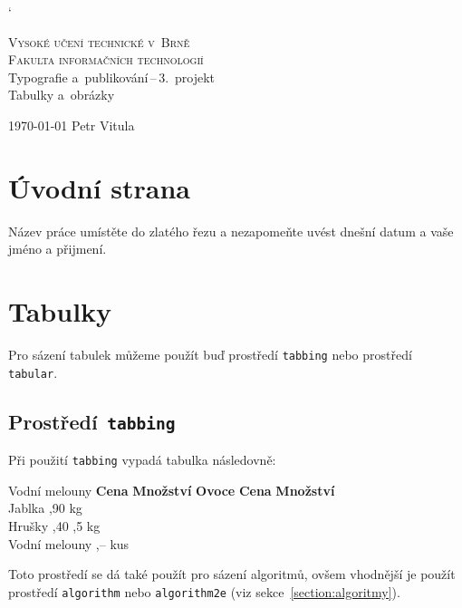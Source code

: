 \documentclass[a4paper, 11pt]{article}
\begin{document}
\catcode`

\begin{titlepage}
        \begin{center}
            \Huge
			\textsc{Vysoké učení technické v~Brně} \\
			\huge
			\textsc{Fakulta informačních technologií} \\
			\LARGE
			Typografie a~publikování\,--\,3.~projekt \\
			\Huge
			Tabulky a~obrázky
		\end{center}

		{\Large
			\today
			\hfill
			Petr Vitula
		}
\end{titlepage}

\section{Úvodní strana}
Název práce umístěte do zlatého řezu a nezapomeňte uvést dnešní datum a vaše jméno a přijmení.


\section{Tabulky}
Pro sázení tabulek můžeme použít buď prostředí \verb|tabbing| nebo prostředí \verb|tabular|.


\subsection{Prostředí\texttt{ tabbing}}
Při použití \verb|tabbing| vypadá tabulka následovně:

\begin{tabbing}
        Vodní melouny \quad	\= \textbf{Cena} \quad	\= \textbf{Množství}	\kill
		\textbf{Ovoce}		\> \textbf{Cena}		\> \textbf{Množství}	\\
		Jablka				,90				 kg					\\
		Hrušky				,40				,5 kg				\\
		Vodní melouny		,--				 kus				\\
\end{tabbing}
Toto prostředí se dá také použít pro sázení algoritmů, ovšem vhodnější je použít prostředí \verb|algorithm| nebo \verb|algorithm2e| (viz sekce~\ref{section:algoritmy}).
\end{document}
